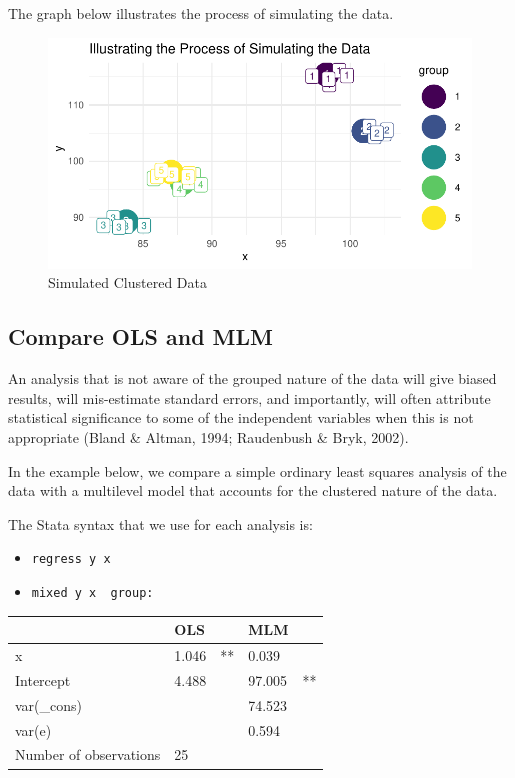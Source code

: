 \documentclass[
  letterpaper,
  DIV=11,
  numbers=noendperiod]{scrreprt}
\providecommand{\tightlist}{%
  \setlength{\itemsep}{0pt}\setlength{\parskip}{0pt}}\usepackage{longtable,booktabs,array}
\begin{document}
The graph below illustrates the process of simulating the data.

\begin{figure}

{\centering \includegraphics{./cross-sectional_files/figure-pdf/unnamed-chunk-3-1.pdf}

}

\caption{Simulated Clustered Data}

\end{figure}

\hypertarget{compare-ols-and-mlm}{%
\subsection{Compare OLS and MLM}\label{compare-ols-and-mlm}}

An analysis that is not aware of the grouped nature of the data will
give biased results, will mis-estimate standard errors, and importantly,
will often attribute statistical significance to some of the independent
variables when this is not appropriate (Bland \& Altman, 1994;
Raudenbush \& Bryk, 2002).

In the example below, we compare a simple ordinary least squares
analysis of the data with a multilevel model that accounts for the
clustered nature of the data.

The Stata syntax that we use for each analysis is:

\begin{itemize}
\tightlist
\item
  \texttt{regress\ y\ x}
\item
  \texttt{mixed\ y\ x\ \textbar{}\textbar{}\ group:}
\end{itemize}

\begin{longtable}[]{@{}lllll@{}}
\toprule()
& OLS & & MLM & \\
\midrule()
\endhead
x & 1.046 & ** & 0.039 & \\
Intercept & 4.488 & & 97.005 & ** \\
var(\_cons) & & & 74.523 & \\
var(e) & & & 0.594 & \\
Number of observations & 25 & & & \\
\bottomrule()
\end{longtable}
\end{document}
